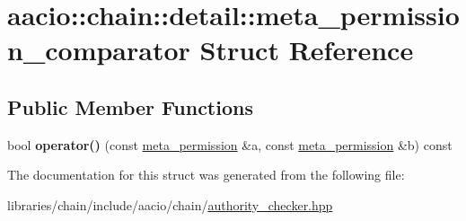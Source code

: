\hypertarget{structaacio_1_1chain_1_1detail_1_1meta__permission__comparator}{}\section{aacio\+:\+:chain\+:\+:detail\+:\+:meta\+\_\+permission\+\_\+comparator Struct Reference}
\label{structaacio_1_1chain_1_1detail_1_1meta__permission__comparator}
\subsection*{Public Member Functions}
\begin{DoxyCompactItemize}
\item 
\mbox{\label{structaacio_1_1chain_1_1detail_1_1meta__permission__comparator_a459ccf7cf83fb8be83ef7c742913a21b}} 
bool {\bfseries operator()} (const \mbox{\hyperlink{classfc_1_1static__variant}{meta\+\_\+permission}} \&a, const \mbox{\hyperlink{classfc_1_1static__variant}{meta\+\_\+permission}} \&b) const
\end{DoxyCompactItemize}


The documentation for this struct was generated from the following file\+:\begin{DoxyCompactItemize}
\item 
libraries/chain/include/aacio/chain/\mbox{\hyperlink{authority__checker_8hpp}{authority\+\_\+checker.\+hpp}}\end{DoxyCompactItemize}
